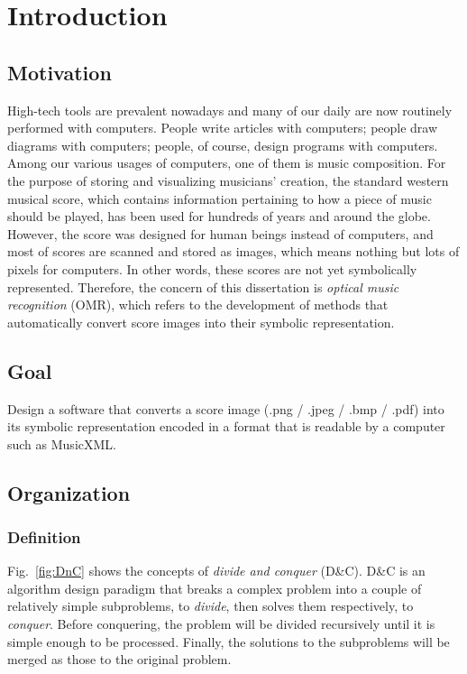 \chapter{Introduction}
\label{c:intro}

\section{Motivation}
\label{section:motivation}
High-tech tools are prevalent nowadays and many of our daily are now routinely performed with computers. People write articles with computers; people draw diagrams with computers; people, of course, design programs with computers. Among our various usages of computers, one of them is music composition. For the purpose of storing and visualizing musicians' creation, the standard western musical score, which contains information pertaining to how a piece of music should be played, has been used for hundreds of years and around the globe. However, the score was designed for human beings instead of computers, and most of scores are scanned and stored as images, which means nothing but lots of pixels for computers. In other words, these scores are not yet symbolically represented. Therefore, the concern of this dissertation is \emph{optical music recognition} (OMR), which refers to the development of methods that automatically convert score images into their symbolic representation.

\section{Goal}
\label{section:goal}
Design a software that converts a score image (.png / .jpeg / .bmp / .pdf) into its symbolic representation encoded in a format that is readable by a computer such as MusicXML.

\section{Organization}
\subsection{Definition}
\label{section:divide-and-conquer}

Fig.~\ref{fig:DnC} shows the concepts of \emph{divide and conquer} (D\&C). D\&C is an algorithm design paradigm that breaks a complex problem into a couple of relatively simple subproblems, to \emph{divide}, then solves them respectively, to \emph{conquer}. Before conquering, the problem will be divided recursively until it is simple enough to be processed. Finally, the solutions to the subproblems will be merged as those to the original problem.


